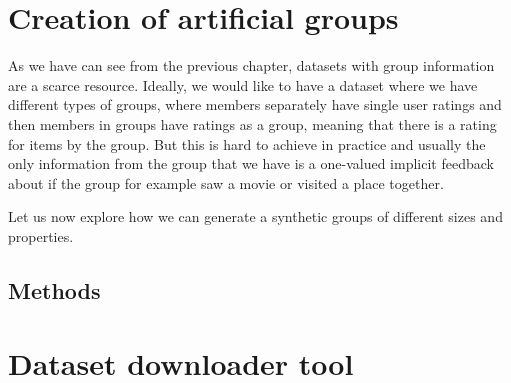 \section{Creation of artificial groups}

As we have can see from the previous chapter, datasets with group information are a scarce resource. Ideally, we would like to have a dataset where we have different types of groups, where members separately have single user ratings and then members in groups have ratings as a group, meaning that there is a rating for items by the group. But this is hard to achieve in practice and usually the only information from the group that we have is a one-valued implicit feedback about if the group for example saw a movie or visited a place together.

Let us now explore how we can generate a synthetic groups of different sizes and properties.

\subsection{Methods}



\section{Dataset downloader tool}

